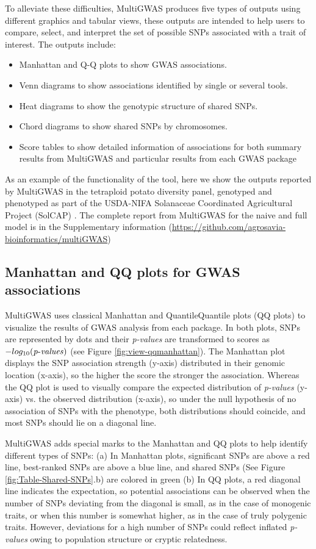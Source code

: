 \documentclass{article}
\begin{document}
To alleviate these difficulties, MultiGWAS produces five types of
outputs using different graphics and tabular views, these outputs
are intended to help users to compare, select, and interpret the set
of possible SNPs associated with a trait of interest. The outputs
include: 
\begin{itemize}
\item Manhattan and Q-Q plots to show GWAS associations. 
\item Venn diagrams to show associations identified by single or several
tools.
\item Heat diagrams to show the genotypic structure of shared SNPs.
\item Chord diagrams to show shared SNPs by chromosomes.
\item Score tables to show detailed information of associations for both
summary results from MultiGWAS and particular results from each GWAS
package
\end{itemize}
As an example of the functionality of the tool, here we show the outputs
reported by MultiGWAS in the tetraploid potato diversity panel, genotyped
and phenotyped as part of the USDA-NIFA Solanaceae Coordinated Agricultural
Project (SolCAP) \cite{Hirsch2013}. The complete report from MultiGWAS
for the naive and full model is in the Supplementary information (\url{https://github.com/agrosavia-bioinformatics/multiGWAS}) 


\subsection{Manhattan and QQ plots for GWAS associations }

MultiGWAS uses classical Manhattan and Quantile\textendash Quantile
plots (QQ plots) to visualize the results of GWAS analysis from each
package. In both plots, SNPs are represented by dots and their \emph{p-values}
are transformed to scores as $-log_{10}({\operatorname{\mathit{p-values}}})$ (see Figure
\ref{fig:view-qqmanhattan}). The Manhattan plot displays the SNP
association strength (y-axis) distributed in their genomic location
(x-axis), so the higher the score the stronger the association. Whereas
the QQ plot is used to visually compare the expected distribution
of \emph{p-values }(y-axis) vs. the observed distribution (x-axis),
so under the null hypothesis of no association of SNPs with the phenotype,
both distributions should coincide, and most SNPs should lie on a
diagonal line.

MultiGWAS adds special marks to the Manhattan and QQ plots to help
identify different types of SNPs: (a) In Manhattan plots, significant
SNPs are above a red line, best-ranked SNPs are above a blue line,
and shared SNPs (See Figure \ref{fig:Table-Shared-SNPs}.b) are colored
in green (b) In QQ plots, a red diagonal line indicates the expectation,
so potential associations can be observed when the number of SNPs
deviating from the diagonal is small, as in the case of monogenic
traits, or when this number is somewhat higher, as in the case of
truly polygenic traits. However, deviations for a high number of SNPs
could reflect inflated \emph{p-values }owing to population structure
or cryptic relatedness.
\end{document}
